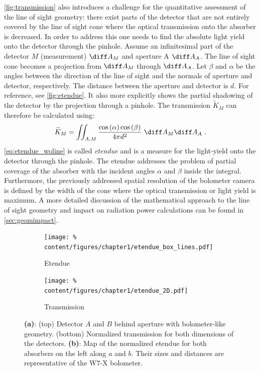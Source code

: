 %
            \autoref{fig:transmission} also introduces a challenge for the quantitative assessment of the line of sight geometry: there exist parts of the detector that are not entirely covered by the line of sight cone where the optical transmission onto the absorber is decreased. In order to address this one needs to find the absolute light yield onto the detector through the pinhole. Assume an infinitesimal part of the detector $M$ (measurement) $\diff A_{M}$ and aperture A $\diff A_{A}$. The line of sight cone becomes a projection from $\diff A_{M}$ through $\diff A_{A}$. Let $\beta$ and $\alpha$ be the angles between the direction of the line of sight and the normals of aperture and detector, respectively. The distance between the aperture and detector is $d$. For reference, see \cref{fig:etendue}. It also more explicitly shows the partial shadowing of the detector by the projection through a pinhole. The transmission $\widetilde{K}_{M}$ can therefore be calculated using:%
%
            \begin{align}%
                \widetilde{K}_{M}=\iint_{A, M}\frac{\cos\left(\alpha\right)\cos\left(\beta\right)}{4\pi d^{2}}\,\,\diff A_{M}\diff A_{A}\,\,.\label{eq:etendue_woline}%
            \end{align}%
%
            \autoref{eq:etendue_woline} is called \textit{etendue} and is a measure for the light-yield onto the detector through the pinhole. The etendue addresses the problem of partial coverage of the absorber with the incident angles $\alpha$ and $\beta$ inside the integral. Furthermore, the previously addressed spatial resolution of the bolometer camera is defined by the width of the cone where the optical transmission or light yield is maximum. A more detailed discussion of the mathematical approach to the line of sight geometry and impact on radiation power calculations can be found in \cref{sec:geomimpact}.\\%
%
            \begin{figure}[t]%
                \centering%
                \begin{subfigure}{0.4\textwidth}%
                    \texttt{[image: \%
                        content/figures/chapter1/etendue\_box\_lines.pdf]}%
                    \caption{Etendue}\label{fig:etendue_box}%
                \end{subfigure}%
                \hspace*{1.0cm}%
                \begin{subfigure}{0.5\textwidth}%
                    \texttt{[image: \%
                        content/figures/chapter1/etendue\_2D.pdf]}%
                    \caption{Transmission}\label{fig:trans_map}%
                \end{subfigure}%
                \caption{\textbf{(a)}: (top) Detector $A$ and $B$ behind aperture with bolometer-like geometry. (bottom) Normalized transmission for both dimensions of the detectors. \textbf{(b)}: Map of the normalized etendue for both absorbers on the left along $a$ and $b$. Their sizes and distances are representative of the W7-X bolometer.}\label{fig:etendue_transmission}%
            \end{figure}
